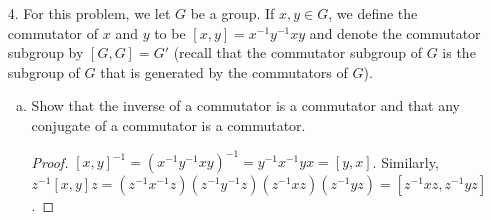 \begin{itemize}
\begin{enumerate}[(a)]
\begin{proof}
    \end{proof}
    
    \item Show that $\Kern(p(X))$ is a $\sigma$-invariant subspace of $V$. When $p(X) = X - \lambda$ where $\lambda \in k$, explain why $\Kern(p(X))$ is the eigenspace of $\sigma$ with respect to $\lambda$.
    \begin{proof}

    \end{proof}
    
    \item Let $p(X)$ and $q(X)$ be polynomials in $k[X]$ so that $\text{gcd}(p(X), q(X)) = 1$. Show that 
    $$\Kern(p(X)q(X)) = \Kern(p(X)) + \Kern(q(X))$$
    and that this sum is direct. Further show that, if $c(X) \in k[X]$ is factored as 
    $$c(X) = p_1(X) p_2(X) ... p_m(X)$$
    where $p_i(X) \in k[X]$ and $\text{gcd}(p_i(X), p_j(X)) = 1$ for all $1 \leq i < j \leq m$, then
    $$\Kern(c(X)) = \Kern(p_1(X)) + \Kern(p_2(X)) + ... + \Kern(p_m(X))$$
    and that this sum is direct. (\textbf{Hint}: Use the fact that if $\text{gcd}(p(X), q(X)) = 1$ then there exist $a(X), b(X) \in k[X]$ so that $a(X)p(X) + b(X)q(X) = 1$.)
    \begin{proof}

    \end{proof}
    
    \item Let $\lambda_i \in k$, $1 \leq i \leq t$, be distinct eigenvalues of $\sigma$. Let $B_i = \{u_{ij} : 1 \leq j \leq m_i\}$ be a basis for the eigenspace of $\lambda_i$ for $1 \leq i \leq t$. Use part (c) to show that the union $B_1 \cup B_2 \cup ... \cup B_t$ is a set of independent vectors.
    \begin{proof}

    \end{proof}
\end{enumerate}











\item[4.] For this problem, we let $G$ be a group. If $x, y \in G$, we define the commutator of $x$ and $y$ to be $[x, y] = x^{-1}y^{-1}xy$ and denote the commutator subgroup by $[G, G] = G'$ (recall that the commutator subgroup of $G$ is the subgroup of $G$ that is generated by the commutators of $G$).
\begin{enumerate}[(a)]
    \item Show that the inverse of a commutator is a commutator and that any conjugate of a commutator is a commutator.
    \begin{proof}
    $[x, y]^{-1} = (x^{-1}y^{-1}xy)^{-1} = y^{-1}x^{-1}yx = [y, x]$. Similarly, $z^{-1}[x,y]z = (z^{-1}x^{-1}z) (z^{-1}y^{-1}z) (z^{-1}xz) (z^{-1}yz) = [z^{-1}xz, z^{-1}yz]$.
    \end{proof}
    

\end{enumerate}
\end{itemize}
